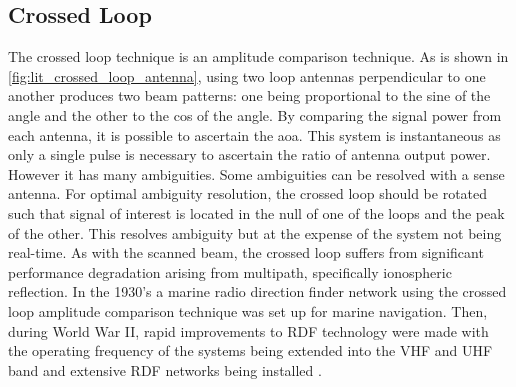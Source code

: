 \subsection{Crossed Loop}
The crossed loop technique is an amplitude comparison technique. 
As is shown in \autoref{fig:lit_crossed_loop_antenna}, using two loop antennas perpendicular to one another produces two beam patterns: one being proportional to the sine of the angle and the other to the cos of the angle. 
By comparing the signal power from each antenna, it is possible to ascertain the \gls{aoa}. This system is instantaneous as only a single pulse is necessary to ascertain the ratio of antenna output power. However it has many ambiguities. Some ambiguities can be resolved with a sense antenna. 
For optimal ambiguity resolution, the crossed loop should be rotated such that signal of interest is located in the null of one of the loops and the peak of the other. This resolves ambiguity but at the expense of the system not being real-time.
As with the scanned beam, the crossed loop suffers from significant performance degradation arising from multipath, specifically ionospheric reflection. 
In the 1930's a marine radio direction finder network using the crossed loop amplitude comparison technique was set up for marine navigation. Then, during World War II, rapid improvements to RDF technology were made with the operating frequency of the systems being extended into the VHF and UHF band  and extensive RDF networks being installed \cite{jenkins1991smallaperture}.
